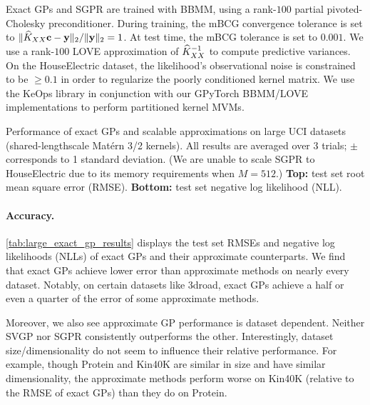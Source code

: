 Exact GPs and SGPR are trained with BBMM, using a rank-$100$ partial pivoted-Cholesky preconditioner.
During training, the mBCG convergence tolerance is set to  $\Vert \widehat{K}_{XX} \mathbf{c} - \mathbf{y} \Vert_2 / \Vert \mathbf{y} \Vert_2 = 1$.
At test time, the mBCG tolerance is set to $0.001$.
We use a rank-$100$ LOVE approximation of $\widehat{K}_{XX}^{-1}$ to compute predictive variances.
On the HouseElectric dataset, the likelihood's observational noise is constrained to be $\geq 0.1$ in order to regularize the poorly conditioned kernel matrix.
We use the KeOps library \cite{charlier2020kernel} in conjunction with our GPyTorch BBMM/LOVE implementations to perform partitioned kernel MVMs.

\begin{table}[!tb]
  \caption[Performance of exact GPs and scalable approximations on large UCI datasets.]{
    Performance of exact GPs and scalable approximations on large UCI datasets (shared-lengthscale Mat\'ern 3/2 kernels).
    All results are averaged over 3 trials; $\pm$ corresponds to 1 standard deviation.
    (We are unable to scale SGPR to HouseElectric due to its memory requirements when $M=512$.)
    {\bf Top:} test set root mean square error (RMSE).
    {\bf Bottom:} test set negative log likelihood (NLL).
  }
  \label{tab:large_exact_gp_results}
  \centering
  \vspace{1em}

  \resizebox{\textwidth}{!}{%
    
  }
  \vspace{1em}

  \resizebox{\textwidth}{!}{%
    
  }
  \vspace{1em}
\end{table}

\paragraph{Accuracy.}
\cref{tab:large_exact_gp_results} displays the test set RMSEs and negative log likelihoods (NLLs) of exact GPs and their approximate counterparts.
We find that exact GPs achieve lower error than approximate methods on nearly every dataset.
Notably, on certain datasets like 3droad, exact GPs achieve a half or even a quarter of the error of some approximate methods.

Moreover, we also see approximate GP performance is dataset dependent.
Neither SVGP nor SGPR consistently outperforms the other.
Interestingly, dataset size/dimensionality do not seem to influence their relative performance.
For example, though Protein and Kin40K are similar in size and have similar dimensionality, the approximate methods perform worse on Kin40K (relative to the RMSE of exact GPs) than they do on Protein.

